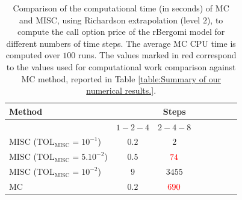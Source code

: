 \begin{table}[!h]
	\centering
	\begin{tabular}{l*{6}{c}r}
		\toprule[1.5pt]
	Method & & Steps  & &     \\
	\hline
		           & $1-2-4$ & $2-4-8$   \\
		\hline

		MISC ($\text{TOL}_{\text{MISC}}=10^{-1}$)  & $0.2$ & $2$ &   \\
		MISC ($\text{TOL}_{\text{MISC}}=5.10^{-2}$)  & $0.5$ & ${\color{red}74}$  \\
		MISC ($\text{TOL}_{\text{MISC}}=10^{-2}$)  & $9$ & $3455$   \\
%		
		\hline
		MC    & $ 0.2$  & ${\color{red}690}$  \\
		
		\bottomrule[1.25pt]
	\end{tabular}
	\caption{Comparison of the computational time (in seconds) of  MC and MISC, using Richardson extrapolation (level $2$), to compute the call option price of the rBergomi model for different numbers of time steps. The 	average MC CPU time is computed over $100$ runs. The values marked in red correspond to the values used for computational work comparison against MC method, reported in Table \ref{table:Summary of our numerical results.}.}
	\label{Comparsion of the computational time of  MC and MISC, using Richardson extrapolation (level $2$), used to compute Call option price of rBergomi model for different number of time steps. Case set $2$ parameters,linear}
\end{table}

\FloatBarrier

